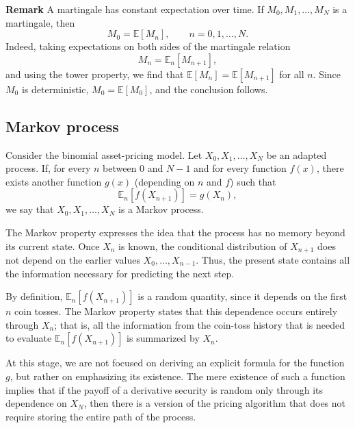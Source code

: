 \medskip

\textbf{Remark}  
A martingale has constant expectation over time.  
If $M_0, M_1, \ldots, M_N$ is a martingale, then
\[
M_0 = \mathbb{E}[M_n], \qquad n = 0,1,\ldots,N.
\]
Indeed, taking expectations on both sides of the martingale relation
\[
M_n = \mathbb{E}_n[M_{n+1}],
\]
and using the tower property, we find that $\mathbb{E}[M_n] = \mathbb{E}[M_{n+1}]$ for all $n$.  
Since $M_0$ is deterministic, $M_0 = \mathbb{E}[M_0]$, and the conclusion follows.
\subsection{Markov process}


\begin{definition} Consider the binomial asset-pricing model.  
Let $X_0, X_1, \ldots, X_N$ be an adapted process.  
If, for every $n$ between $0$ and $N-1$ and for every function $f(x)$,  
there exists another function $g(x)$ (depending on $n$ and $f$) such that
\begin{equation}
    \mathbb{E}_n[f(X_{n+1})] = g(X_n),
\end{equation}
we say that $X_0, X_1, \ldots, X_N$ is a Markov process.
\end{definition}

\begin{remark}
The Markov property expresses the idea that the process has no memory beyond its current state. Once $X_n$ is known, the conditional distribution of $X_{n+1}$ does not depend on the earlier values $X_0,\ldots,X_{n-1}$. Thus, the present state contains all the information necessary for predicting the next step.
\end{remark}


By definition, $\mathbb{E}_n[f(X_{n+1})]$ is a random quantity, since it depends on the first $n$ coin tosses. The Markov property states that this dependence occurs entirely through $X_n$; that is, all the information from the coin-toss history that is needed to evaluate $\mathbb{E}_n[f(X_{n+1})]$ is summarized by $X_n$.

At this stage, we are not focused on deriving an explicit formula for the function $g$, but rather on emphasizing its existence. The mere existence of such a function implies that if the payoff of a derivative security is random only through its dependence on $X_N$, then there is a version of the pricing algorithm that does not require storing the entire path of the process.

